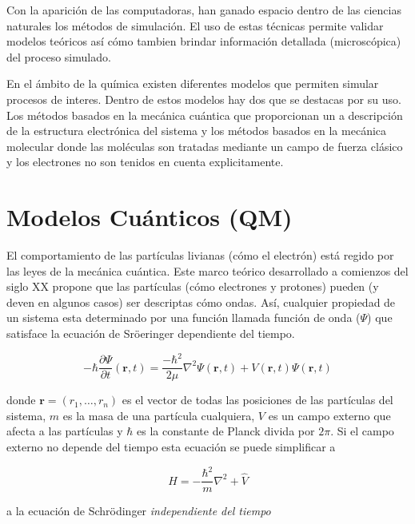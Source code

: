 Con la aparici\'on de las computadoras, han ganado espacio dentro de las ciencias naturales los m\'etodos de simulaci\'on.
El uso de estas t\'ecnicas permite validar modelos te\'oricos as\'i c\'omo tambien brindar informaci\'on detallada (microsc\'opica) del proceso simulado.

En el \'ambito de la qu\'imica existen diferentes modelos que permiten simular procesos de interes.
Dentro de estos modelos hay dos que se destacas por su uso.
Los m\'etodos basados en la mec\'anica cu\'antica que proporcionan un a descripci\'on de la estructura electr\'onica del sistema y los m\'etodos basados en la mec\'anica molecular donde las mol\'eculas son tratadas mediante un campo de fuerza
cl\'asico y los electrones no son tenidos en cuenta explicitamente.

\section{Modelos Cu\'anticos (QM)}

El comportamiento de las part\'iculas livianas (c\'omo el electr\'on) est\'a regido por las leyes de la mec\'anica cu\'antica.
Este marco te\'orico desarrollado a comienzos del siglo XX propone que las part\'iculas (c\'omo electrones y protones) pueden (y deven en algunos casos) 
ser descriptas c\'omo ondas. As\'i, cualquier propiedad de un sistema esta determinado por una funci\'on llamada funci\'on de onda ($\Psi$) que satisface la ecuaci\'on de Sr\"oeringer dependiente del tiempo.

\begin{equation}
    \label{schro_time_dep}
    -\hbar\frac{\partial \Psi}{\partial t} (\mathbf{r},t) = \frac{-\hbar^2}{2\mu}\nabla^2 \Psi(\mathbf{r},t) + V(\mathbf{r},t) \Psi(\mathbf{r},t)
\end{equation}

donde $\mathbf{r} = (r_1,\dots,r_n)$ es el vector de todas las posiciones de las part\'iculas del sistema,
$m$ es la masa de una part\'icula cualquiera, $V$ es un campo externo que afecta a las part\'iculas y
$\hbar$ es la constante de Planck divida por $2\pi$. Si el campo externo no depende del tiempo esta ecuaci\'on se puede simplificar a 

\begin{equation*}
    \hat{H} =  -\frac{\hbar^2}{m} \nabla^2 + \hat{V}
\end{equation*}

a la ecuaci\'on de Schr\"odinger \textit{independiente del tiempo}

